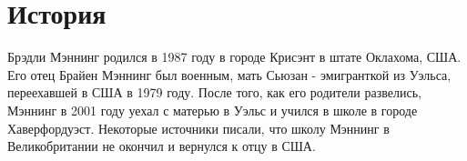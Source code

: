 ﻿\section{История}
Брэдли Мэннинг родился в 1987 году в городе Крисэнт в штате Оклахома, США.
Его отец Брайен Мэннинг был военным, мать Сьюзан - эмигранткой из Уэльса, переехавшей в США в 1979 году.
После того, как его родители развелись, Мэннинг в 2001 году уехал с матерью в Уэльс и учился в школе в городе Хаверфордуэст.
Некоторые источники писали, что школу Мэннинг в Великобритании не окончил и вернулся к отцу в США. \cite{People}
